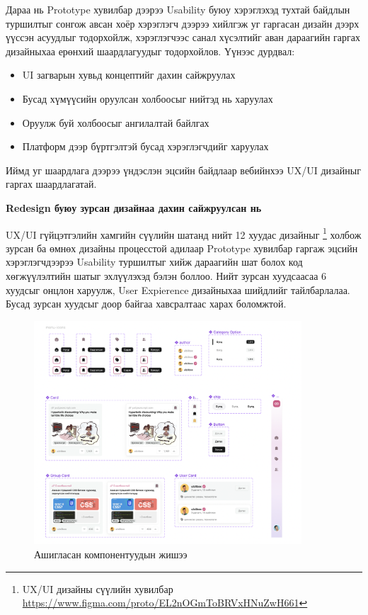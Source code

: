 Дараа нь Prototype хувилбар дээрээ Usability буюу хэрэглэхэд тухтай байдлын туршилтыг сонгож авсан хоёр хэрэглэгч дээрээ хийлгэж уг гаргасан дизайн дээрх үүссэн асуудлыг тодорхойлж, хэрэглэгчээс санал хүсэлтийг аван дараагийн гаргах дизайныхаа ерөнхий шаардлагуудыг тодорхойлов. Үүнээс дурдвал:

\begin{itemize}
	\item UI загварын хувьд концептийг дахин сайжруулах
	\item Бусад хүмүүсийн оруулсан холбоосыг нийтэд нь харуулах
	\item Оруулж буй холбоосыг ангилалтай байлгах
	\item Платформ дээр бүртгэлтэй бусад хэрэглэгчдийг харуулах
\end{itemize}

Иймд уг шаардлага дээрээ үндэслэн эцсийн байдлаар вебийнхээ UX/UI дизайныг гаргах шаардлагатай.

\textbf{Redesign буюу зурсан дизайнаа дахин сайжруулсан нь}

UX/UI гүйцэтгэлийн хамгийн сүүлийн шатанд нийт 12 хуудас дизайныг \footnote{UX/UI дизайны сүүлийн хувилбар \url{https://www.figma.com/proto/EL2nOGmToBRVxHNuZwH661}} холбож зурсан ба өмнөх дизайны процесстой адилаар Prototype хувилбар гаргаж эцсийн хэрэглэгчдээрээ Usability туршилтыг хийж дараагийн шат болох код хөгжүүлэлтийн шатыг эхлүүлэхэд бэлэн боллоо. Нийт зурсан хуудсаасаа 6 хуудсыг онцлон харуулж, User Expierence дизайныхаа шийдлийг тайлбарлалаа. Бусад зурсан хуудсыг доор байгаа хавсралтаас харах боломжтой. 

\begin{figure}[h]
	\centering
	\includegraphics[width=10cm]{images/interfaces/components.png}
	\caption{Ашигласан компонентуудын жишээ}
	\label{fig:component}
\end{figure}

